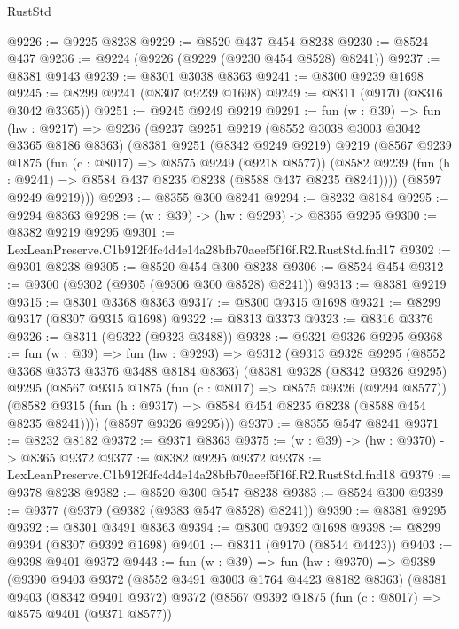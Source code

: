 \begin{lexlean}{RustStd}
\begin{coremodule}
@9226 := @9225 @8238
@9229 := @8520 @437 @454 @8238
@9230 := @8524 @437
@9236 := @9224 (@9226 (@9229 (@9230 @454 @8528) @8241))
@9237 := @8381 @9143
@9239 := @8301 @3038 @8363
@9241 := @8300 @9239 @1698
@9245 := @8299 @9241 (@8307 @9239 @1698)
@9249 := @8311 (@9170 (@8316 @3042 @3365))
@9251 := @9245 @9249 @9219
@9291 := fun (w : @39) =>
  fun (hw : @9217) =>
  @9236
    (@9237
      @9251
      @9219
      (@8552 @3038 @3003 @3042 @3365 @8186 @8363)
      (@8381
        @9251
        (@8342 @9249 @9219)
        @9219
        (@8567
          @9239
          @1875
          (fun (c : @8017) => @8575 @9249 (@9218 @8577))
          (@8582 @9239 (fun (h : @9241) => @8584 @437 @8235 @8238 (@8588 @437 @8235 @8241))))
        (@8597 @9249 @9219)))
@9293 := @8355 @300 @8241
@9294 := @8232 @8184
@9295 := @9294 @8363
@9298 := (w : @39) -> (hw : @9293) -> @8365 @9295
@9300 := @8382 @9219 @9295
@9301 := LexLeanPreserve.C1b912f4fc4d4e14a28bfb70aeef5f16f.R2.RustStd.fnd17
@9302 := @9301 @8238
@9305 := @8520 @454 @300 @8238
@9306 := @8524 @454
@9312 := @9300 (@9302 (@9305 (@9306 @300 @8528) @8241))
@9313 := @8381 @9219
@9315 := @8301 @3368 @8363
@9317 := @8300 @9315 @1698
@9321 := @8299 @9317 (@8307 @9315 @1698)
@9322 := @8313 @3373
@9323 := @8316 @3376
@9326 := @8311 (@9322 (@9323 @3488))
@9328 := @9321 @9326 @9295
@9368 := fun (w : @39) =>
  fun (hw : @9293) =>
  @9312
    (@9313
      @9328
      @9295
      (@8552 @3368 @3373 @3376 @3488 @8184 @8363)
      (@8381
        @9328
        (@8342 @9326 @9295)
        @9295
        (@8567
          @9315
          @1875
          (fun (c : @8017) => @8575 @9326 (@9294 @8577))
          (@8582 @9315 (fun (h : @9317) => @8584 @454 @8235 @8238 (@8588 @454 @8235 @8241))))
        (@8597 @9326 @9295)))
@9370 := @8355 @547 @8241
@9371 := @8232 @8182
@9372 := @9371 @8363
@9375 := (w : @39) -> (hw : @9370) -> @8365 @9372
@9377 := @8382 @9295 @9372
@9378 := LexLeanPreserve.C1b912f4fc4d4e14a28bfb70aeef5f16f.R2.RustStd.fnd18
@9379 := @9378 @8238
@9382 := @8520 @300 @547 @8238
@9383 := @8524 @300
@9389 := @9377 (@9379 (@9382 (@9383 @547 @8528) @8241))
@9390 := @8381 @9295
@9392 := @8301 @3491 @8363
@9394 := @8300 @9392 @1698
@9398 := @8299 @9394 (@8307 @9392 @1698)
@9401 := @8311 (@9170 (@8544 @4423))
@9403 := @9398 @9401 @9372
@9443 := fun (w : @39) =>
  fun (hw : @9370) =>
  @9389
    (@9390
      @9403
      @9372
      (@8552 @3491 @3003 @1764 @4423 @8182 @8363)
      (@8381
        @9403
        (@8342 @9401 @9372)
        @9372
        (@8567
          @9392
          @1875
          (fun (c : @8017) => @8575 @9401 (@9371 @8577))

\end{coremodule}
\end{lexlean}
